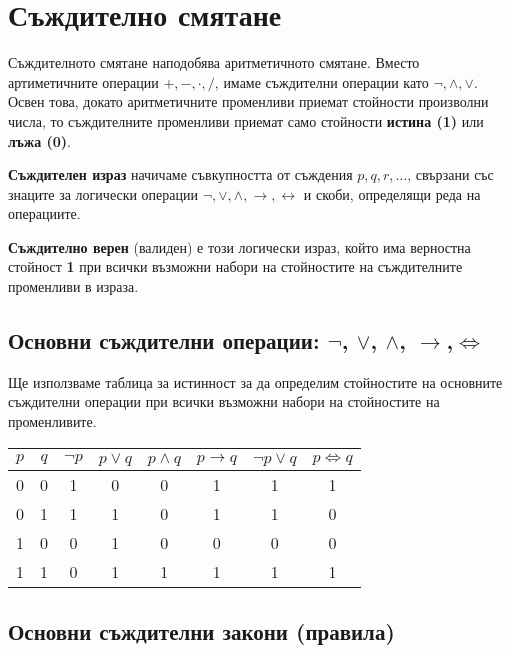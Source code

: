 \section{Съждително смятане}
\label{sect:propositional}

Съждителното смятане наподобява аритметичното смятане.
Вместо артиметичните операции $+,-,\cdot,/$, имаме съждителни операции като $\neg, \wedge, \vee$.
Освен това, докато аритметичните променливи приемат стойности произволни числа, то
съждителните променливи приемат само стойности {\bf истина (1)} или {\bf лъжа (0)}.

{\bf Съждителен израз} начичаме съвкупността от съждения $p,q,r,\dots$, свързани със знаците за логически операции
$\neg, \vee, \wedge, \rightarrow, \leftrightarrow$ и скоби, определящи реда на операциите.

{\bf Съждително верен} (валиден) е този логически израз, който има верностна стойност {\bf 1} при всички възможни набори на
стойностите на съждителните променливи в израза.

\subsection*{Основни  съждителни операции: $\neg$, $\vee$, $\wedge$, $\rightarrow$,$\iff$}
Ще използваме таблица за истинност за да определим стойностите на основните съждителни операции
при всички възможни набори на стойностите на променливите.

\begin{tabular}{|c|c|c|c|c|c|c|c|}
  \hline
  $p$ & $q$ & $\neg p$ & $p \vee q$ & $p \wedge q$ & $p \rightarrow q$ & $\neg p \vee q$ & $p \iff q$\\
  \hline
  0 & 0 & 1 & 0 & 0 & 1 & 1 & 1 \\
  \hline
  0 & 1 & 1 & 1 & 0 & 1 & 1 & 0 \\
  \hline
  1 & 0 & 0 & 1 & 0 & 0 & 0 & 0 \\
  \hline
  1 & 1 & 0 & 1 & 1 & 1 & 1 & 1 \\
  \hline
\end{tabular}


\subsection*{Основни съждителни закони (правила)}

